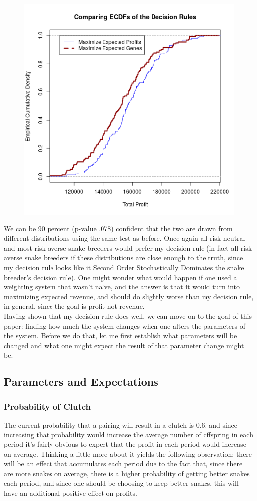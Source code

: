 \documentclass{article}
\begin{document}
	\begin{figure}[H]
	\centering
	\includegraphics[width=.75\textwidth]{newECDF.png}
	\end{figure}
	
	We can be 90 percent (p-value .078) confident that the two are drawn from different distributions using the same test as before. Once again all risk-neutral and most risk-averse snake breeders  would prefer my decision rule (in fact all risk averse snake breeders if these distributions are close enough to the truth, since my decision rule looks like it Second Order Stochastically Dominates the snake breeder's decision rule). One might wonder what would happen if one used a weighting system that wasn't naive, and the answer is that it would turn into maximizing expected revenue, and should do slightly worse than my decision rule, in general, since the goal is profit not revenue.\\
	\indent Having shown that my decision rule does well, we can move on to the goal of this paper: finding how much the system changes when one alters the parameters of the system. Before we do that, let me first establish what parameters will be changed and what one might expect the result of that parameter change might be.
	\subsection*{Parameters and Expectations}
		\subsubsection*{Probability of Clutch}
		\indent\indent The current probability that a pairing will result in a clutch is 0.6, and since increasing that probability would increase the average number of offspring in each period it's fairly obvious to expect that the profit in each period would increase on average. Thinking a little more about it yields the following observation: there will be an effect that accumulates each period due to the fact that, since there are more snakes on average, there is a higher probability of getting better snakes each period, and since one should be choosing to keep better snakes, this will have an additional positive effect on profits.
\end{document}
